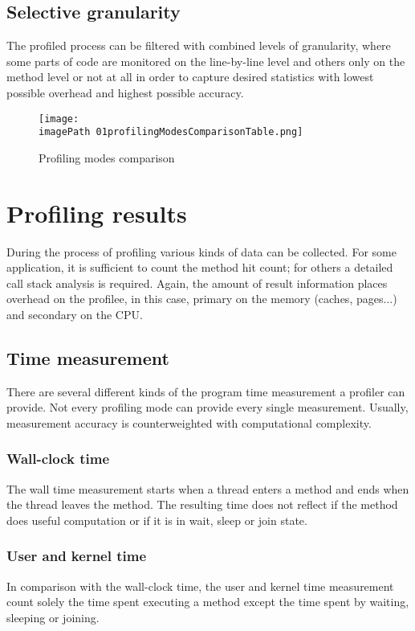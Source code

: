 \subsection{Selective granularity}
The profiled process can be filtered with combined levels of granularity, where some parts of code are monitored on the line-by-line level and others only on the method level or not at all in order to capture desired statistics with lowest possible overhead and highest possible accuracy.

\begin{figure}
	\centering
		\texttt{[image: \\imagePath 01profilingModesComparisonTable.png]}
		\caption{Profiling modes comparison}
	\label{fig:01profilingModesComparisonTable}
\end{figure}


\section{Profiling results}
During the process of profiling various kinds of data can be collected. For some application, it is sufficient to count the method hit count; for others a detailed call stack analysis is required. Again, the amount of result information places overhead on the profilee, in this case, primary on the memory (caches, pages...) and secondary on the CPU.

\subsection{Time measurement}
There are several different kinds of the program time measurement a profiler can provide. Not every profiling mode can provide every single measurement. Usually, measurement accuracy is counterweighted with computational complexity.

\subsubsection*{Wall-clock time}
The wall time measurement starts when a thread enters a method and ends when the thread leaves the method. The resulting time does not reflect if the method does useful computation or if it is in wait,  sleep or join state.

\subsubsection*{User and kernel time}
In comparison with the wall-clock time, the user and kernel time measurement count solely the time spent executing a method except the time spent by waiting, sleeping or joining.

